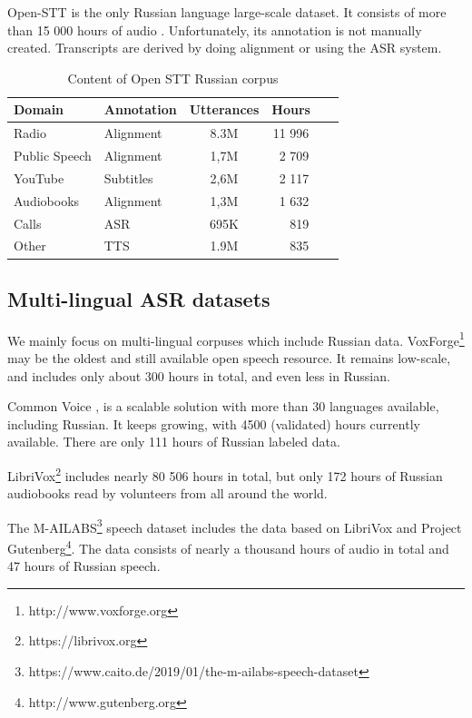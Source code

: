 \documentclass[a4paper]{article}
\begin{document}
Open-STT is the only Russian language large-scale dataset. It consists of more than 15 000 hours of audio \cite{veysov2020towardimagenetstt}. Unfortunately, its annotation is not manually created. Transcripts are derived by doing alignment or using the ASR system. 

\begin{table}[th]
  \caption{Content of Open STT Russian corpus}
  \label{tab:openstt}
  \centering
  \begin{tabular}{ llcr }
    \toprule
    Domain & Annotation & Utterances & Hours~~~  \\
    \midrule
    Radio &     Alignment & 8.3M & 11 996 ~~~  \\
    Public Speech & Alignment  & 1,7M & 2 709 ~~~ \\
    YouTube & Subtitles  & 2,6M & 2 117 ~~~ \\
    Audiobooks & Alignment  & 1,3M & 1 632 ~~~ \\
    Calls & ASR  & 695K & 819 ~~~ \\
    Other & TTS  & 1.9M & 835 ~~~ \\
    \bottomrule
  \end{tabular}
\end{table}

\subsection{Multi-lingual ASR datasets}

We mainly focus on multi-lingual corpuses which include Russian data. VoxForge\footnote{http://www.voxforge.org} may be the oldest and still available open speech resource. It remains low-scale, and includes only about 300 hours in total, and even less in Russian.

Common Voice \cite{ardila2019common}, is a scalable solution with more than 30 languages available, including Russian. It keeps growing, with 4500 (validated) hours currently available. There are only 111 hours of Russian labeled data.

LibriVox\footnote{https://librivox.org} includes nearly 80 506 hours in total, but only 172 hours of Russian audiobooks read by volunteers from all around the world.

The M-AILABS\footnote{https://www.caito.de/2019/01/the-m-ailabs-speech-dataset} speech dataset includes the data based on LibriVox and Project Gutenberg\footnote{http://www.gutenberg.org}. The data consists of nearly a thousand hours of audio in total and 47 hours of Russian speech.
\end{document}
